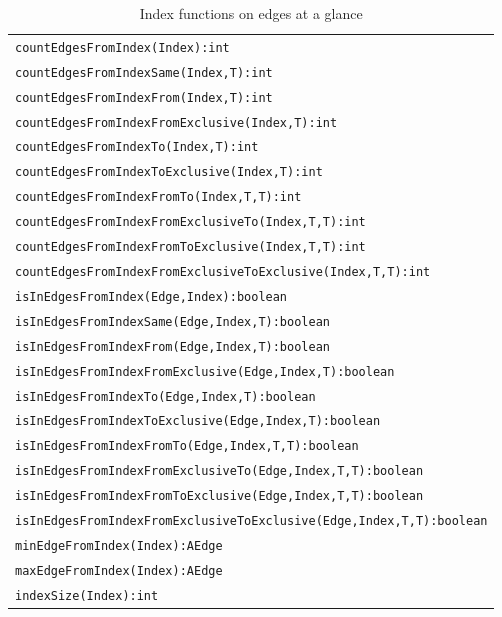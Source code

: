 \begin{table}[htbp]
\centering
\begin{tabular}{|l|}
\hline
\texttt{countEdgesFromIndex(Index):int}\\
\texttt{countEdgesFromIndexSame(Index,T):int}\\
\texttt{countEdgesFromIndexFrom(Index,T):int}\\
\texttt{countEdgesFromIndexFromExclusive(Index,T):int}\\
\texttt{countEdgesFromIndexTo(Index,T):int}\\
\texttt{countEdgesFromIndexToExclusive(Index,T):int}\\
\texttt{countEdgesFromIndexFromTo(Index,T,T):int}\\
\texttt{countEdgesFromIndexFromExclusiveTo(Index,T,T):int}\\
\texttt{countEdgesFromIndexFromToExclusive(Index,T,T):int}\\
\texttt{countEdgesFromIndexFromExclusiveToExclusive(Index,T,T):int}\\
\hline
\texttt{isInEdgesFromIndex(Edge,Index):boolean}\\
\texttt{isInEdgesFromIndexSame(Edge,Index,T):boolean}\\
\texttt{isInEdgesFromIndexFrom(Edge,Index,T):boolean}\\
\texttt{isInEdgesFromIndexFromExclusive(Edge,Index,T):boolean}\\
\texttt{isInEdgesFromIndexTo(Edge,Index,T):boolean}\\
\texttt{isInEdgesFromIndexToExclusive(Edge,Index,T):boolean}\\
\texttt{isInEdgesFromIndexFromTo(Edge,Index,T,T):boolean}\\
\texttt{isInEdgesFromIndexFromExclusiveTo(Edge,Index,T,T):boolean}\\
\texttt{isInEdgesFromIndexFromToExclusive(Edge,Index,T,T):boolean}\\
\texttt{isInEdgesFromIndexFromExclusiveToExclusive(Edge,Index,T,T):boolean}\\
\hline
\texttt{minEdgeFromIndex(Index):AEdge}\\
\texttt{maxEdgeFromIndex(Index):AEdge}\\
\hline
\texttt{indexSize(Index):int}\\
\hline
\end{tabular}
\caption{Index functions on edges at a glance}
\label{indexedgestab}
\end{table}

